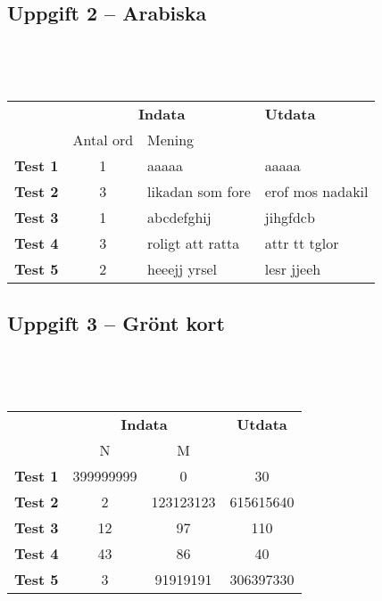 \documentclass[a4paper,12pt,oneside]{amsbook}
\theoremstyle{test}
\newcommand{\fe}[1]{\textbf{#1}}            %
\begin{document}
\subsection*{Uppgift 2 -- Arabiska}
~\\
{\tt 
\begin{tabular}{||l||c|l||l||}\hline\hline
& \multicolumn{2}{c||}{\fe{Indata}} & \fe{Utdata} \\ 
& Antal ord & Mening & \\ \hline \hline
\fe{Test 1} & 1 & aaaaa & aaaaa \\ \hline
\fe{Test 2} & 3 & likadan som fore & erof mos nadakil \\ \hline
\fe{Test 3} & 1 & abcdefghij & jihgfdcb\\ \hline
\fe{Test 4} & 3 & roligt att ratta & attr tt tglor \\ \hline
\fe{Test 5} & 2 & heeejj yrsel & lesr jjeeh \\ \hline\hline
\end{tabular}
}


\subsection*{Uppgift 3 -- Grönt kort}
~\\
{\tt 
\begin{tabular}{||l||c|c||c||}\hline\hline
& \multicolumn{2}{c||}{\fe{Indata}} & \fe{Utdata} \\ 
& N & M & \\ \hline \hline
\fe{Test 1} & 399999999 & 0 & 30 \\ \hline
\fe{Test 2} & 2 & 123123123 & 615615640 \\ \hline
\fe{Test 3} & 12 & 97 & 110 \\ \hline
\fe{Test 4} & 43 & 86 & 40 \\ \hline
\fe{Test 5} & 3 & 91919191 & 306397330  \\ \hline\hline
\end{tabular}
}
\end{document}
